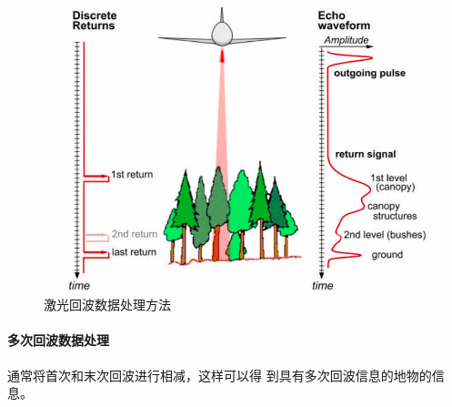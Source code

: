 \begin{figure}[htbp]
	\centering
	\includegraphics[width=0.5\linewidth]{figure/Chapter6/激光回波数据处理方法}
	\caption{激光回波数据处理方法}
	\label{fig:激光回波数据处理方法}
\end{figure}

\paragraph{多次回波数据处理}
通常将首次和末次回波进行相减，这样可以得
到具有多次回波信息的地物的信息。

